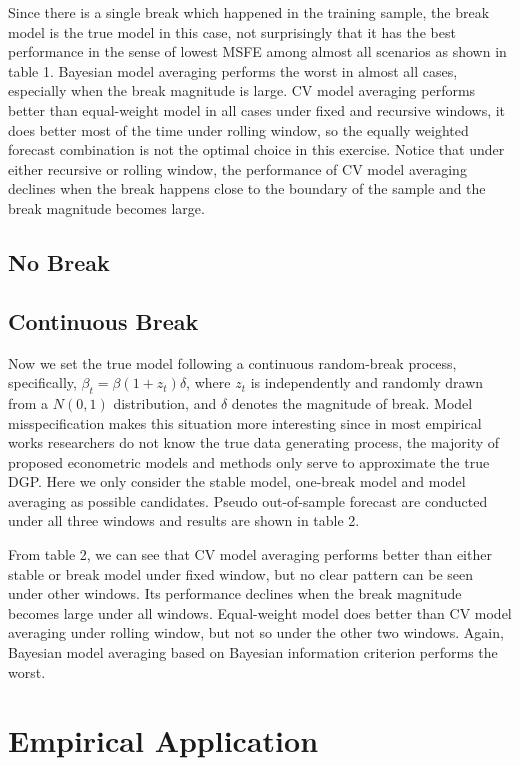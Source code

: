 \documentclass[a4paper,12pt]{article}
\begin{document}
Since there is a single break which happened in the training sample, the break model is the true model in this case, not surprisingly that it has the best performance in the sense of lowest MSFE among almost all scenarios as shown in table 1. Bayesian model averaging performs the worst in almost all cases, especially when the break magnitude is large. CV model averaging performs better than equal-weight model in all cases under fixed and recursive windows, it does better most of the time under rolling window, so the equally weighted forecast combination is not the optimal choice in this exercise. Notice that under either recursive or rolling window, the performance of CV model averaging declines when the break happens close to the boundary of the sample and the break magnitude becomes large.
\subsection{No Break}

\subsection{Continuous Break}
Now we set the true model following a continuous random-break process, specifically, $\beta_{t} = \beta (1+z_{t}) \delta$, where $z_{t}$ is independently and randomly drawn from a $N(0,1)$ distribution, and $\delta$ denotes the magnitude of break. Model misspecification makes this situation more interesting since in most empirical works researchers do not know the true data generating process, the majority of proposed econometric models and methods only serve to approximate the true DGP. Here we only consider the stable model, one-break model and model averaging as possible candidates. Pseudo out-of-sample forecast are conducted under all three windows and results are shown in table 2.

From table 2, we can see that CV model averaging performs better than either stable or break model under fixed window, but no clear pattern can be seen under other windows. Its performance declines when the break magnitude becomes large under all windows. Equal-weight model does better than CV model averaging under rolling window, but not so under the other two windows. Again, Bayesian model averaging based on Bayesian information criterion performs the worst.
\section{Empirical Application}
\end{document}
